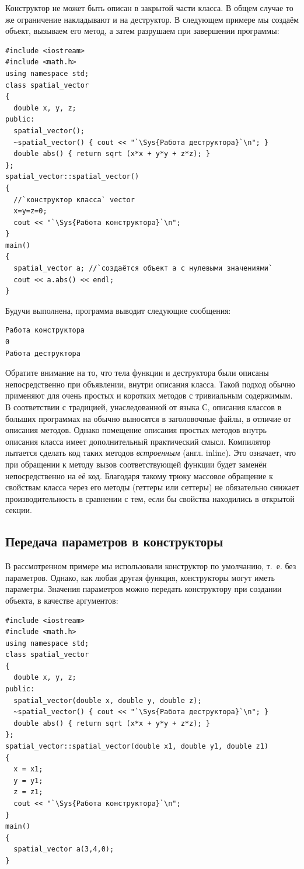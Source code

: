 Конструктор не может быть описан в закрытой части класса. В общем случае то же ограничение накладывают и на деструктор.
В следующем примере мы создаём объект, вызываем его метод, а затем разрушаем при завершении программы:
\begin{lstlisting}
#include <iostream>
#include <math.h>
using namespace std;
class spatial_vector 
{
  double x, y, z;
public:
  spatial_vector();
  ~spatial_vector() { cout << "`\Sys{Работа деструктора}`\n"; }
  double abs() { return sqrt (x*x + y*y + z*z); }
};
spatial_vector::spatial_vector() 
{
  //`конструктор класса` vector
  x=y=z=0;
  cout << "`\Sys{Работа конструктора}`\n";
}
main() 
{
  spatial_vector a; //`создаётся объект a с нулевыми значениями`
  cout << a.abs() << endl;
}
\end{lstlisting}

Будучи выполнена, программа выводит следующие сообщения:
\begin{verbatim}
Работа конструктора 
0 
Работа деструктора
\end{verbatim}

Обратите внимание на то, что тела функции  и деструктора были описаны непосредственно при
объявлении, внутри описания класса. Такой подход обычно применяют для очень простых и коротких методов с тривиальным
содержимым. В соответствии с традицией, унаследованной от языка С, описания классов в больших программах на  обычно
выносятся в заголовочные файлы, в отличие от описания методов. Однако помещение описания простых методов внутрь
описания класса имеет дополнительный практический смысл. Компилятор пытается сделать код таких методов
\emph{встроенным} (англ. inline). Это означает, что при обращении к методу вызов соответствующей функции
будет заменён непосредственно на её код. Благодаря такому трюку массовое обращение к свойствам класса через его методы
(геттеры или сеттеры) не обязательно снижает производительность в сравнении с тем, если бы свойства находились в
открытой секции.

\subsection[Передача параметров в конструкторы]{Передача параметров в конструкторы}
В рассмотренном примере мы использовали конструктор по умолчанию, т.~е. без параметров. Однако, как любая другая
функция, конструкторы могут иметь параметры. Значения параметров можно передать конструктору при создании объекта, в
качестве аргументов:
\begin{lstlisting}
#include <iostream>
#include <math.h>
using namespace std;
class spatial_vector 
{
  double x, y, z;
public:
  spatial_vector(double x, double y, double z);
  ~spatial_vector() { cout << "`\Sys{Работа деструктора}`\n"; }
  double abs() { return sqrt (x*x + y*y + z*z); }
};
spatial_vector::spatial_vector(double x1, double y1, double z1) 
{
  x = x1;
  y = y1;
  z = z1;
  cout << "`\Sys{Работа конструктора}`\n";
}
main() 
{
  spatial_vector a(3,4,0);
}
\end{lstlisting}


